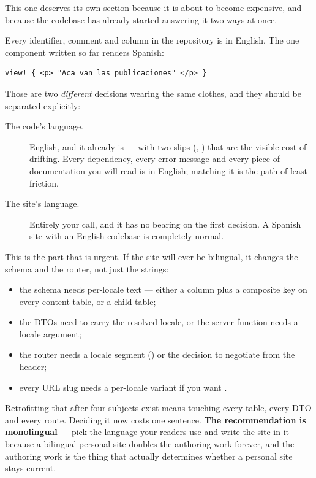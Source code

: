 This one deserves its own section because it is about to become expensive, and because the codebase
has already started answering it two ways at once.

Every identifier, comment and column in the repository is in English. The one component written so
far renders Spanish:

\begin{lstlisting}[style=rs]
view! { <p> "Aca van las publicaciones" </p> }
\end{lstlisting}

Those are two \emph{different} decisions wearing the same clothes, and they should be separated
explicitly:

\begin{description}
  \item[The code's language.] English, and it already is --- with two slips
    (, ) that are the visible cost of drifting.
    Every dependency, every error message and every piece of documentation you will read is in
    English; matching it is the path of least friction.

  \item[The site's language.] Entirely your call, and it has no bearing on the first decision. A
    Spanish site with an English codebase is completely normal.
\end{description}

\begin{pattern}
This is the part that is urgent. If the site will ever be bilingual, it changes the schema and the
router, not just the strings:

\begin{itemize}
  \item the schema needs per-locale text --- either a  column plus a composite key on
    every content table, or a  child table;
  \item the DTOs need to carry the resolved locale, or the server function needs a locale argument;
  \item the router needs a locale segment () or the decision to negotiate from
    the  header;
  \item every URL slug needs a per-locale variant if you want .
\end{itemize}

Retrofitting that after four subjects exist means touching every table, every DTO and every route.
Deciding it now costs one sentence. \textbf{The recommendation is monolingual} --- pick the language
your readers use and write the site in it --- because a bilingual personal site doubles the
authoring work forever, and the authoring work is the thing that actually determines whether a
personal site stays current.
\end{pattern}


